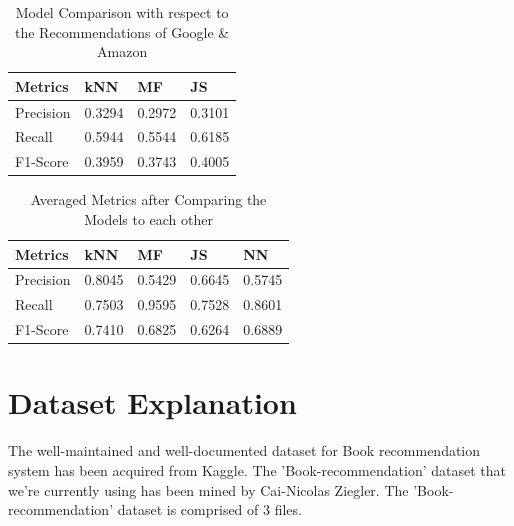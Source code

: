 \vspace{4mm}
\begin{table}[h]
    \centering
    \caption{Model Comparison with respect to the Recommendations of Google \& Amazon}
    \begin{tabular}{|p{0.8in}|p{0.8in}|p{0.8in}|p{0.8in}|}
\hline
        Metrics & kNN & MF & JS \\
        \hline
        Precision & 0.3294 & 0.2972 & 0.3101\\
        Recall & 0.5944 & 0.5544 & 0.6185\\
        F1-Score & 0.3959 & 0.3743 & 0.4005\\
        \hline
    \end{tabular}
    \vspace{2 mm}
    \label{Model Comparison}
\end{table}

\begin{table}[h]
    \centering
    \caption{Averaged Metrics after Comparing the Models to each other}
    \begin{tabular}{|p{0.8in}|p{0.8in}|p{0.8in}|p{0.8in}|p{0.8in}|}
\hline
        Metrics & kNN & MF & JS & NN \\
        \hline
        Precision & 0.8045 & 0.5429& 0.6645 & 0.5745 \\
        Recall & 0.7503 & 0.9595& 0.7528 & 0.8601 \\
        F1-Score & 0.7410 & 0.6825& 0.6264 & 0.6889 \\
        \hline
    \end{tabular}
    \vspace{2 mm}
    \label{Model Comparison-2}
\end{table}

\newpage
\section{Dataset Explanation}
The well-maintained and well-documented dataset for Book recommendation system has been acquired from Kaggle. The 'Book-recommendation' dataset that we're currently using has been mined by Cai-Nicolas Ziegler. The 'Book-recommendation' dataset is comprised of 3 files. 
